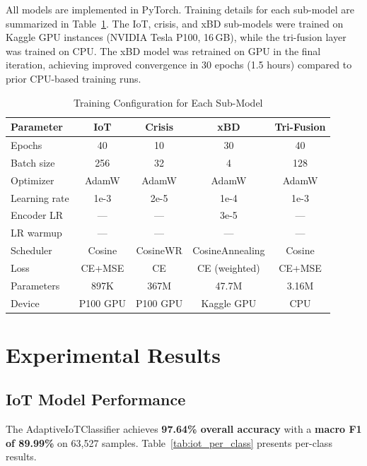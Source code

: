 \documentclass[journal]{IEEEtran}
\begin{document}
All models are implemented in PyTorch. Training details for each sub-model are summarized in Table~\ref{tab:training_config}. The IoT, crisis, and xBD sub-models were trained on Kaggle GPU instances (NVIDIA Tesla P100, 16\,GB), while the tri-fusion layer was trained on CPU. The xBD model was retrained on GPU in the final iteration, achieving improved convergence in 30 epochs (1.5 hours) compared to prior CPU-based training runs.

\begin{table}[!t]
\centering
\caption{Training Configuration for Each Sub-Model}
\label{tab:training_config}
\begin{tabular}{lcccc}
\toprule
\textbf{Parameter} & \textbf{IoT} & \textbf{Crisis} & \textbf{xBD} & \textbf{Tri-Fusion} \\
\midrule
Epochs & 40 & 10 & 30 & 40 \\
Batch size & 256 & 32 & 4 & 128 \\
Optimizer & AdamW & AdamW & AdamW & AdamW \\
Learning rate & 1e-3 & 2e-5 & 1e-4 & 1e-3 \\
Encoder LR & --- & --- & 3e-5 & --- \\
LR warmup & --- & --- & --- & --- \\
Scheduler & Cosine & CosineWR & CosineAnnealing & Cosine \\
Loss & CE+MSE & CE & CE (weighted) & CE+MSE \\
Parameters & 897K & 367M & 47.7M & 3.16M \\
Device & P100 GPU & P100 GPU & Kaggle GPU & CPU \\
\bottomrule
\end{tabular}
\end{table}

\section{Experimental Results}

\subsection{IoT Model Performance}

The AdaptiveIoTClassifier achieves \textbf{97.64\% overall accuracy} with a \textbf{macro F1 of 89.99\%} on 63,527 samples. Table~\ref{tab:iot_per_class} presents per-class results.
\end{document}
